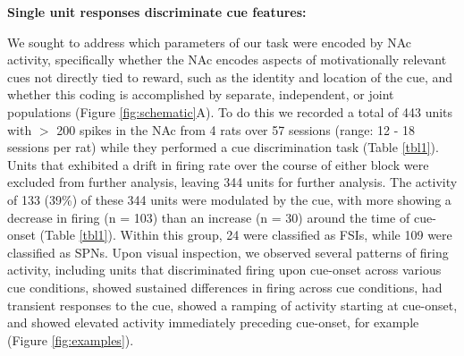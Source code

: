 \documentclass[11pt]{article}
\begin{document}
{\bf Single unit responses discriminate cue features:}

We sought to address which parameters of our task were encoded by NAc activity, specifically whether the NAc encodes aspects of motivationally relevant cues not directly tied to reward, such as the identity and location of the cue, and whether this coding is accomplished by separate, independent, or joint populations (Figure \ref{fig:schematic}A). To do this we recorded a total of 443 units with $>$ 200 spikes in the NAc from 4 rats over 57 sessions (range: 12 - 18 sessions per rat) while they performed a cue discrimination task (Table \ref{tbl1}). Units that exhibited a drift in firing rate over the course of either block were excluded from further analysis, leaving 344 units for further analysis. The activity of 133 (39\%) of these 344 units were modulated by the cue, with more showing a decrease in firing (n = 103) than an increase (n = 30) around the time of cue-onset (Table \ref{tbl1}). Within this group, 24 were classified as FSIs, while 109 were classified as SPNs. Upon visual inspection, we observed several patterns of firing activity, including units that discriminated firing upon cue-onset across various cue conditions, showed sustained differences in firing across cue conditions, had transient responses to the cue, showed a ramping of activity starting at cue-onset, and showed elevated activity immediately preceding cue-onset, for example (Figure \ref{fig:examples}). 
\end{document}
